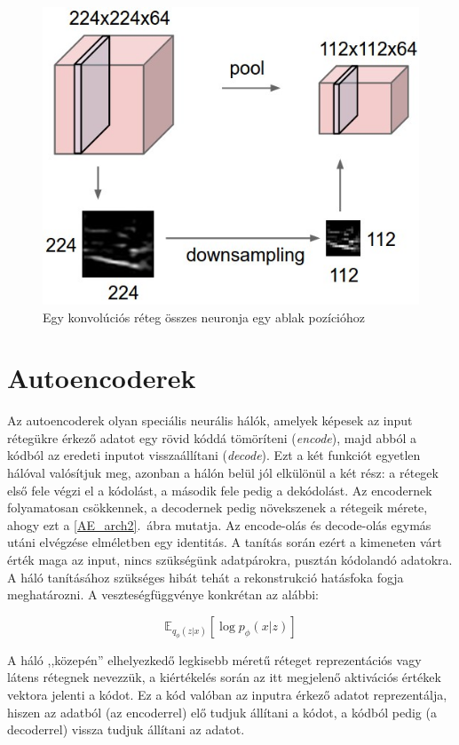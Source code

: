 \begin{figure}[h!]
\begin{center}
  
	\begin{center}
	\includegraphics[width=0.5\linewidth]{pool.jpeg}
	\end{center}
	
  \caption{Egy konvolúciós réteg összes neuronja egy ablak pozícióhoz}\label{pool}
\end{center}
\end{figure}

\section{Autoencoderek}

Az autoencoderek olyan speciális neurális hálók, amelyek képesek az input rétegükre érkező adatot egy rövid kóddá tömöríteni (\emph{encode}), majd abból a kódból az eredeti inputot visszaállítani (\emph{decode}). Ezt a két funkciót egyetlen hálóval valósítjuk meg, azonban a hálón belül jól elkülönül a két rész: a rétegek első fele végzi el a kódolást, a második fele pedig a dekódolást. Az encodernek folyamatosan csökkennek, a decodernek pedig növekszenek a rétegeik mérete, ahogy ezt a \ref{AE_arch2}.~ábra mutatja. Az encode-olás és decode-olás egymás utáni elvégzése elméletben egy identitás. A tanítás során ezért a kimeneten várt érték maga az input, nincs szükségünk adatpárokra, pusztán kódolandó adatokra. A háló tanításához szükséges hibát tehát a rekonstrukció hatásfoka fogja meghatározni. A veszteségfüggvénye konkrétan az alábbi:

$$ \mathbb{E}_{q_\phi(z|x)} [\log p_\phi(x|z)]$$

A háló ,,közepén'' elhelyezkedő legkisebb méretű réteget reprezentációs vagy látens rétegnek nevezzük, a kiértékelés során az itt megjelenő aktivációs értékek vektora jelenti a kódot. Ez a kód valóban az inputra érkező adatot reprezentálja, hiszen az adatból (az encoderrel) elő tudjuk állítani a kódot, a kódból pedig (a decoderrel) vissza tudjuk állítani az adatot.

